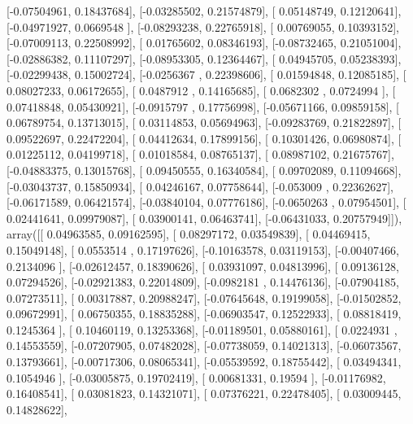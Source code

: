 \documentclass{article}
\begin{document}
       [-0.07504961,  0.18437684],
       [-0.03285502,  0.21574879],
       [ 0.05148749,  0.12120641],
       [-0.04971927,  0.0669548 ],
       [-0.08293238,  0.22765918],
       [ 0.00769055,  0.10393152],
       [-0.07009113,  0.22508992],
       [ 0.01765602,  0.08346193],
       [-0.08732465,  0.21051004],
       [-0.02886382,  0.11107297],
       [-0.08953305,  0.12364467],
       [ 0.04945705,  0.05238393],
       [-0.02299438,  0.15002724],
       [-0.0256367 ,  0.22398606],
       [ 0.01594848,  0.12085185],
       [ 0.08027233,  0.06172655],
       [ 0.0487912 ,  0.14165685],
       [ 0.0682302 ,  0.0724994 ],
       [ 0.07418848,  0.05430921],
       [-0.0915797 ,  0.17756998],
       [-0.05671166,  0.09859158],
       [ 0.06789754,  0.13713015],
       [ 0.03114853,  0.05694963],
       [-0.09283769,  0.21822897],
       [ 0.09522697,  0.22472204],
       [ 0.04412634,  0.17899156],
       [ 0.10301426,  0.06980874],
       [ 0.01225112,  0.04199718],
       [ 0.01018584,  0.08765137],
       [ 0.08987102,  0.21675767],
       [-0.04883375,  0.13015768],
       [ 0.09450555,  0.16340584],
       [ 0.09702089,  0.11094668],
       [-0.03043737,  0.15850934],
       [ 0.04246167,  0.07758644],
       [-0.053009  ,  0.22362627],
       [-0.06171589,  0.06421574],
       [-0.03840104,  0.07776186],
       [-0.0650263 ,  0.07954501],
       [ 0.02441641,  0.09979087],
       [ 0.03900141,  0.06463741],
       [-0.06431033,  0.20757949]]), array([[ 0.04963585,  0.09162595],
       [ 0.08297172,  0.03549839],
       [ 0.04469415,  0.15049148],
       [ 0.0553514 ,  0.17197626],
       [-0.10163578,  0.03119153],
       [-0.00407466,  0.2134096 ],
       [-0.02612457,  0.18390626],
       [ 0.03931097,  0.04813996],
       [ 0.09136128,  0.07294526],
       [-0.02921383,  0.22014809],
       [-0.0982181 ,  0.14476136],
       [-0.07904185,  0.07273511],
       [ 0.00317887,  0.20988247],
       [-0.07645648,  0.19199058],
       [-0.01502852,  0.09672991],
       [ 0.06750355,  0.18835288],
       [-0.06903547,  0.12522933],
       [ 0.08818419,  0.1245364 ],
       [ 0.10460119,  0.13253368],
       [-0.01189501,  0.05880161],
       [ 0.0224931 ,  0.14553559],
       [-0.07207905,  0.07482028],
       [-0.07738059,  0.14021313],
       [-0.06073567,  0.13793661],
       [-0.00717306,  0.08065341],
       [-0.05539592,  0.18755442],
       [ 0.03494341,  0.1054946 ],
       [-0.03005875,  0.19702419],
       [ 0.00681331,  0.19594   ],
       [-0.01176982,  0.16408541],
       [ 0.03081823,  0.14321071],
       [ 0.07376221,  0.22478405],
       [ 0.03009445,  0.14828622],
\end{document}
